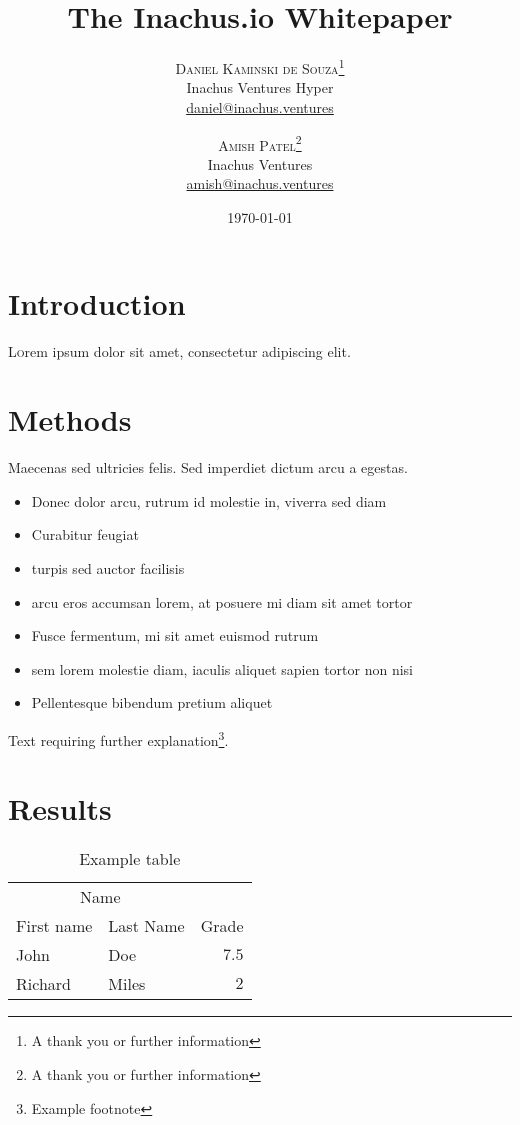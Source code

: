 \documentclass[twoside,twocolumn]{article}
\title{The Inachus.io Whitepaper} %
\author{
  \textsc{Daniel Kaminski de Souza}\thanks{A thank you or further information} \\[1ex] %
  \normalsize Inachus Ventures Hyper \\ %
  \normalsize \href{mailto:daniel@inachus.ventures}{daniel@inachus.ventures} %
  \and %
  \textsc{Amish Patel}\thanks{A thank you or further information} \\[1ex] %
  \normalsize Inachus Ventures \\ %
  \normalsize \href{mailto:amish@inachus.ventures}{amish@inachus.ventures} %
}
\date{\today} %
\begin{document}
\maketitle


\section{Introduction}

\lettrine[nindent=0em,lines=3]{L} orem ipsum dolor sit amet, consectetur adipiscing elit.
\blindtext %

\blindtext %


\section{Methods}

Maecenas sed ultricies felis. Sed imperdiet dictum arcu a egestas.
\begin{itemize}
  \item Donec dolor arcu, rutrum id molestie in, viverra sed diam
  \item Curabitur feugiat
  \item turpis sed auctor facilisis
  \item arcu eros accumsan lorem, at posuere mi diam sit amet tortor
  \item Fusce fermentum, mi sit amet euismod rutrum
  \item sem lorem molestie diam, iaculis aliquet sapien tortor non nisi
  \item Pellentesque bibendum pretium aliquet
\end{itemize}
\blindtext %

Text requiring further explanation\footnote{Example footnote}.


\section{Results}

\begin{table}
  \caption{Example table}
  \centering
  \begin{tabular}{llr}
    \toprule
    \multicolumn{2}{c}{Name}       \\
    \cmidrule(r){1-2}
    First name & Last Name & Grade \\
    \midrule
    John       & Doe       & $7.5$ \\
    Richard    & Miles     & $2$   \\
    \bottomrule
  \end{tabular}
\end{table}
\end{document}
